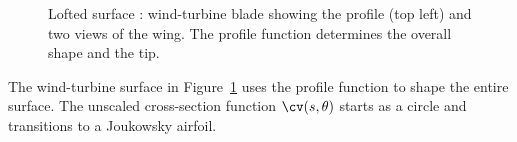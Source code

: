 % 
% 
% 
% 


{
\newcommand{\figWidth}{8cm}
\newcommand{\trimfig}[2]{\trimPlot{#1}{#2}{.0}{.0}{.30}{.20}}
\newcommand{\figWidtha}{8cm}
\newcommand{\trimfiga}[2]{\trimPlot{#1}{#2}{.0}{.0}{.20}{.25}}
\begin{figure}[hbt]
\begin{center}
\end{center}
\caption{Lofted surface : wind-turbine blade showing the profile (top left) and two views of the wing. The
profile function determines the overall shape and the tip.}
\label{fig:WindTurbineBladeLoftedSurface}
\end{figure}
}



The wind-turbine surface in Figure~\ref{fig:WindTurbineBladeLoftedSurface} uses the profile function 
to shape the entire surface. The unscaled cross-section function $\cv(s,\theta)$ starts as a circle
and transitions to a Joukowsky airfoil. 

